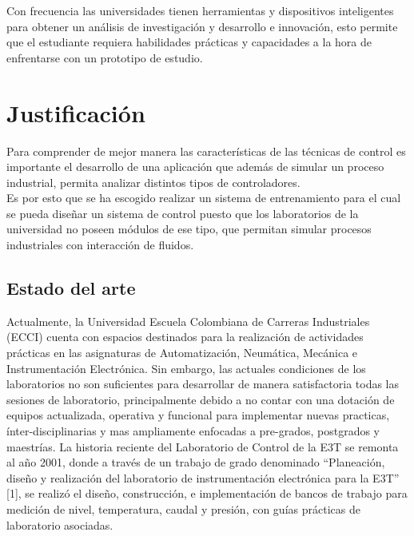 \documentclass[a4paper,12pt,twoside]{proyectotanquesecci}
\begin{document}
Con frecuencia las universidades tienen herramientas y dispositivos inteligentes para obtener un análisis de investigación y desarrollo e innovación, esto permite que el estudiante requiera habilidades prácticas y capacidades a la hora de enfrentarse con un prototipo de estudio.\\






\chapter{Justificación}

Para comprender de mejor manera las características de las técnicas de control es importante el desarrollo de una aplicación que además de simular un proceso industrial, permita analizar distintos tipos de controladores. \\

Es por esto que se ha escogido realizar un sistema de entrenamiento para el cual se pueda diseñar un sistema de control puesto que los laboratorios de la universidad no poseen módulos de ese tipo, que permitan simular procesos industriales con interacción de fluidos. \\

\section{Estado del arte}



Actualmente, la Universidad Escuela Colombiana de Carreras Industriales (ECCI) cuenta con espacios destinados para la realización de actividades prácticas en las asignaturas de Automatización, Neumática, Mecánica e Instrumentación Electrónica. Sin embargo, las actuales condiciones de los laboratorios no son suficientes para desarrollar de manera satisfactoria todas las sesiones de laboratorio, principalmente debido a no contar con una dotación de equipos actualizada, operativa y funcional para implementar nuevas practicas, ínter-disciplinarias y mas ampliamente enfocadas a pre-grados, postgrados y maestrías. La historia reciente del Laboratorio de Control de la E3T se remonta al año 2001, donde a través de un trabajo de grado denominado “Planeación, diseño y realización del laboratorio de instrumentación electrónica para la E3T” [1], se realizó el diseño, construcción, e implementación de bancos de trabajo para medición de nivel, temperatura, caudal y presión, con guías prácticas de laboratorio asociadas. \\
\end{document}

